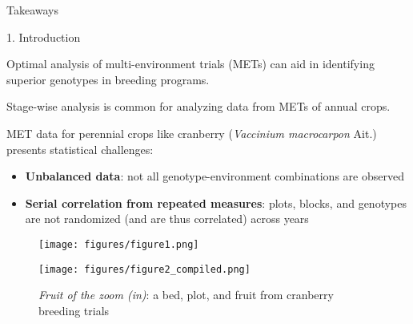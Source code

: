 \documentclass[final]{beamer}
\newlength{\onecolwid}
\begin{document}
\begin{frame}[t]
\begin{columns}[t]
\begin{column}{\onecolwid}
\begin{alertblock}{\Large{Takeaways}}
\end{alertblock}


\begin{block}{1. Introduction}
\vspace{-2cm}


Optimal analysis of multi-environment trials (METs) can aid in identifying superior genotypes in breeding programs\cite{Bernardo2010-iw}.

\vspace{0.5cm}

Stage-wise analysis is common for analyzing data from METs of annual crops\cite{Smith2019-fg}.

\vspace{0.5cm}

MET data for perennial crops like cranberry (\textit{Vaccinium macrocarpon} Ait.) presents statistical challenges:
\begin{itemize}
  \item \textbf{Unbalanced data}: not all genotype-environment combinations are observed
  \item \textbf{Serial correlation from repeated measures}: plots, blocks, and genotypes are not randomized (and are thus correlated) across years\cite{Piepho2013-kv}
\end{itemize}

\vspace{0.5cm}

%
\begin{center}
  \begin{figure}
    \texttt{[image: figures/figure1.png]}
  \end{figure}
\end{center}


%
\begin{center}
  \begin{figure}
    \texttt{[image: figures/figure2\_compiled.png]}
    \caption{\textit{Fruit of the zoom (in)}: a bed, plot, and fruit from cranberry breeding trials}
  \end{figure}
\end{center}






\end{block}
\end{column}
\end{columns}
\end{frame}
\end{document}

